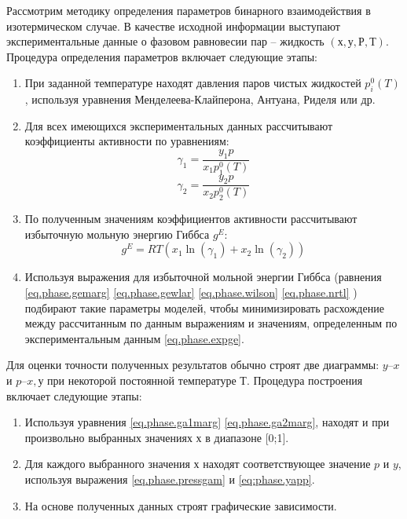 Рассмотрим методику определения параметров бинарного взаимодействия в изотермическом случае. В качестве исходной информации выступают экспериментальные данные о фазовом равновесии пар – жидкость $(х, у, Р, Т)$. Процедура определения параметров включает следующие этапы:
\begin{enumerate}
	\item При заданной температуре находят давления паров чистых жидкостей $p_i^0(T)$, используя уравнения Менделеева-Клайперона, Антуана, Риделя или др.
	\item Для всех имеющихся экспериментальных данных рассчитывают коэффициенты активности по уравнениям:
	\begin{equation}
		\gamma_1=\dfrac{y_1 p}{x_1 p_1^0(T)}
	\end{equation}
	\begin{equation}
		\gamma_2=\dfrac{y_2 p}{x_2 p_2^0(T)}
	\end{equation}
	\item По полученным значениям коэффициентов активности рассчитывают избыточную мольную энергию Гиббса $g^E$:
	\begin{equation}\label{eq.phase.expge}
		g^E=RT(x_1 \ln(\gamma_1)+x_2 \ln(\gamma_2))
	\end{equation}
	\item Используя  выражения для избыточной мольной энергии Гиббса (равнения \eqref{eq.phase.gemarg} \eqref{eq.phase.gewlar} \eqref{eq.phase.wilson} \eqref{eq.phase.nrtl} ) подбирают такие параметры моделей, чтобы минимизировать расхождение между рассчитанным по данным выражениям и значениям, определенным по экспериментальным данным \eqref{eq.phase.expge}.
\end{enumerate}

Для оценки точности полученных результатов обычно строят две диаграммы: $y – x$ и $p – x, у$ при некоторой постоянной температуре $Т$. Процедура построения включает следующие этапы:
\begin{enumerate}
\item Используя уравнения \eqref{eq.phase.ga1marg} \eqref{eq.phase.ga2marg}, находят  и  при произвольно выбранных значениях $х$ в диапазоне [0;1].
\item Для каждого выбранного значения х находят соответствующее значение $p$ и $y$, используя выражения \eqref{eq.phase.pressgam} и \eqref{eq:phase.yapp}.
\item На основе полученных данных строят графические зависимости.
\end{enumerate}

